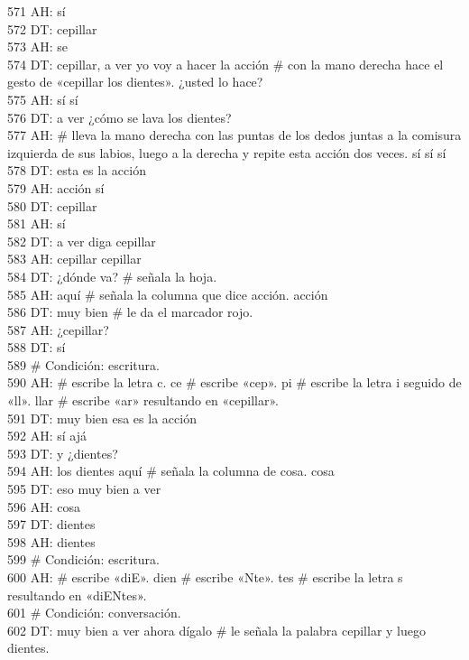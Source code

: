 571 AH: sí\\
572 DT: cepillar\\
573 AH: se\\
574 DT: cepillar, a ver yo voy a hacer la acción \# con la mano derecha hace el gesto de «cepillar los dientes». ¿usted lo hace?\\
575 AH: sí sí\\
576 DT: a ver ¿cómo se lava los dientes?\\
577 AH: \# lleva la mano derecha con las puntas de los dedos juntas a la comisura izquierda de sus labios, luego a la derecha y repite esta acción dos veces. sí sí sí\\
578 DT: esta es la acción\\
579 AH: acción sí\\
580 DT: cepillar\\
581 AH: sí\\
582 DT: a ver diga cepillar\\
583 AH: cepillar cepillar\\
584 DT: ¿dónde va? \# señala la hoja.\\
585 AH: aquí \# señala la columna que dice acción. acción\\
586 DT: muy bien \# le da el marcador rojo.\\
587 AH: ¿cepillar?\\
588 DT: sí\\
589 \# Condición: escritura.\\
590 AH: \# escribe la letra c. ce \# escribe «cep». pi \# escribe la letra i seguido de «ll». llar \# escribe «ar» resultando en «cepillar».\\
591 DT: muy bien esa es la acción\\
592 AH: sí ajá\\
593 DT: y ¿dientes?\\
594 AH: los dientes aquí \# señala la columna de cosa. cosa\\
595 DT: eso muy bien a ver\\
596 AH: cosa\\
597 DT: dientes\\
598 AH: dientes\\
599 \# Condición: escritura.\\
600 AH: \# escribe «diE». dien \# escribe «Nte». tes \# escribe la letra s resultando en «diENtes».\\
601 \# Condición: conversación.\\
602 DT: muy bien a ver ahora dígalo \# le señala la palabra cepillar y luego dientes.\\
